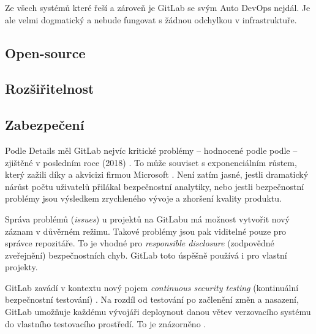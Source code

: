        Ze všech systémů které řeší \CI a zároveň \CD je GitLab se svým Auto DevOps nejdál. Je ale velmi dogmatický a nebude fungovat s žádnou odchylkou v infrastruktuře.

        \blind[1]
        \blind[1]

    \subsection{Open-source}
        \blind[1]

    \subsection{Rozšiřitelnost}
        \blind[1]

    \subsection{Zabezpečení}
        Podle  Details měl GitLab nejvíc kritické problémy -- hodnocené podle podle  -- zjištěné v posledním roce (2018) \cite{cve-gitlab}. To může souviset s exponenciálním růstem, který zažili díky  a akvicizi firmou Microsoft \cite{gitlab-growth}. Není zatím jasné, jestli dramatický nárůst počtu uživatelů přilákal bezpečnostní analytiky, nebo jestli bezpečnostní problémy jsou výsledkem zrychleného vývoje a zhoršení kvality produktu.


        Správa problémů (\textit{issues}) u projektů na GitLabu má možnost vytvořit nový záznam v důvěrném režimu. Takové problémy jsou pak viditelné pouze pro správce repozitáře. To je vhodné pro \textit{responsible disclosure} (zodpovědné zveřejnění) bezpečnostních chyb. GitLab toto úspěšně používá i pro vlastní projekty.

        GitLab zavádí v kontextu \CICD nový pojem \textit{continuous security testing} (kontinuální bezpečnostní testování) \cite{gitlab-app-security}. Na rozdíl od testování po začlenění změn a nasazení, GitLab umožňuje každému vývojáři deploynout danou větev verzovacího systému do vlastního testovacího prostředí. To je znázorněno .

